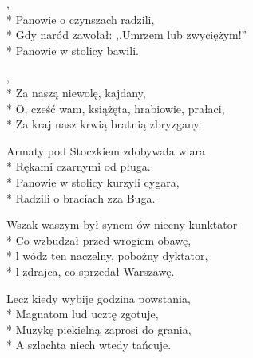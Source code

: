\begin{lyrics}[longestline={Gdy naród zawołał: ,,Umrzem lub zwyciężym!''}]

,\\*
Panowie o czynszach radzili,\\*
Gdy naród zawołał: ,,Umrzem lub zwyciężym!''\\*
Panowie w stolicy bawili.

\begin{chorus}
,\\*
Za naszą niewolę, kajdany,\\*
O, cześć wam, książęta, hrabiowie, prałaci,\\*
Za kraj nasz krwią bratnią zbryzgany.
\end{chorus}

Armaty pod Stoczkiem zdobywała wiara\\*
Rękami czarnymi od pługa.\\*
Panowie w stolicy kurzyli cygara,\\*
Radzili o braciach zza Buga.

\chorusref

Wszak waszym był synem ów niecny kunktator\\*
Co wzbudzał przed wrogiem obawę,\\*
l wódz ten naczelny, pobożny dyktator,\\*
l zdrajca, co sprzedał Warszawę.

\chorusref

Lecz kiedy wybije godzina powstania,\\*
Magnatom lud ucztę zgotuje,\\*
Muzykę piekielną zaprosi do grania,\\*
A szlachta niech wtedy tańcuje.

\chorusref
\end{lyrics}




